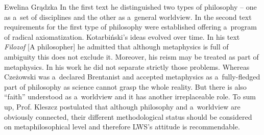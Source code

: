 \begin{editorialeng}{Ewelina Grądzka}
 In the first text he distinguished two types of philosophy – one as a~set of disciplines and the other as a~general worldview. In the second text requirements for the first type of philosophy were established offering a~program of radical axiomatization. Kotarbiński’s ideas evolved over time. In his text \textit{Filozof} [A philosopher] he admitted that although metaphysics is full of ambiguity this does not exclude it. Moreover, his reism may be treated as part of metaphysics. In his work he did not separate strictly those problems. Whereas Czeżowski was a~declared Brentanist and accepted metaphysics as a~fully-fledged part of philosophy as science cannot grasp the whole reality. But there is also “faith” understood as a~worldview and it has another irreplaceable role. To sum up, Prof. Kleszcz postulated that although philosophy and a~worldview are obviously connected, their different methodological status should be considered on metaphilosophical level and therefore LWS’s attitude is recommendable.


\end{editorialeng}
